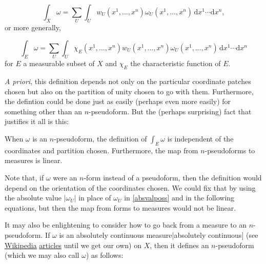 \documentclass[preprint, 5p, 10pt]{elsarticle}
\theoremstyle{plain}
\begin{document}
\begin{itemize}
\begin{displaymath}
\int_X \omega = \sum_U \int_U w_U(x^1,\ldots,x^n) \omega_U(x^1,\ldots,x^n)\, \mathrm{d}x^1 \cdots \mathrm{d}x^n ,
\end{displaymath}
or more generally,

\begin{displaymath}
\int_E \omega = \sum_U \int_U \chi_E(x^1,\ldots,x^n) w_U(x^1,\ldots,x^n) \omega_U(x^1,\ldots,x^n)\, \mathrm{d}x^1 \cdots \mathrm{d}x^n
\end{displaymath}
for $E$ a measurable subset of $X$ and $\chi_E$ the characteristic function of $E$.



\end{itemize}
\emph{A priori}, this definition depends not only on the particular coordinate patches chosen but also on the partition of unity chosen to go with them. Furthermore, the defintion could be done just as easily (perhaps even more easily) for something other than an $n$-pseudoform. But the (perhaps surprising) fact that justifies it all is this:

When $\omega$ is an $n$-pseudoform, the definition of $\int_E \omega$ is independent of the coordinates and partition chosen. Furthermore, the map from $n$-pseudoforms to measures is linear.

Note that, if $\omega$ were an $n$-form instead of a pseudoform, then the definition would depend on the orientation of the coordinates chosen. We could fix that by using the absolute value $|\omega_U|$ in place of $\omega_U$ in \eqref{absvalposs} and in the following equations, but then the map from forms to measures would not be linear.

It may also be enlightening to consider how to go back from a measure to an $n$-pseudoform. If $\omega$ is an absolutely continuous measure|absolutely continuous] (see \href{http://en.wikipedia.org/wiki/absolute_continuity}{Wikipedia} \href{http://en.wikipedia.org/wiki/Radon_measure}{articles} until we get our own) on $X$, then it defines an $n$-pseudoform (which we may also call $\omega$) as follows:
\end{document}
